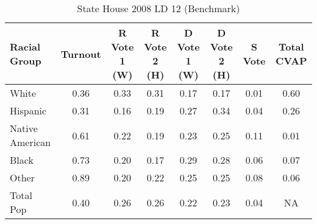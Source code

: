 \begin{table}[!h]
\begin{center}
\caption{State House 2008 LD 12 (Benchmark)}
\label{sthse08_cvap_ld_12}
\begin{tabular}{lccccccc}
  \hline
Racial Group & Turnout & R Vote 1 (W) & R Vote 2 (H) & D Vote 1 (W) & D Vote 2 (H) & S Vote & Total CVAP \\ 
  \hline
 White & 0.36  & 0.33  & 0.31  & 0.17  & 0.17  & 0.01  & 0.60 \\
    Hispanic & 0.31  & 0.16  & 0.19  & 0.27  & 0.34  & 0.04  & 0.26 \\
    Native American & 0.61  & 0.22  & 0.19  & 0.23  & 0.25  & 0.11  & 0.01 \\
    Black & 0.73  & 0.20  & 0.17  & 0.29  & 0.28  & 0.06  & 0.07 \\
    Other & 0.89  & 0.20  & 0.22  & 0.25  & 0.25  & 0.08  & 0.06 \\
    Total Pop & 0.40  & 0.26  & 0.26  & 0.22  & 0.23  & 0.04  & NA \\
   \hline
\end{tabular}
\end{center}
\end{table}